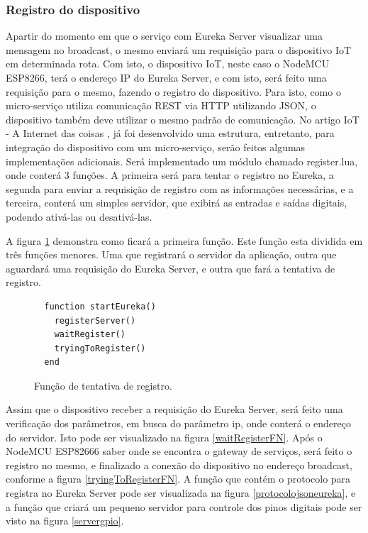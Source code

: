 \documentclass[journal]{IEEEtran}
\begin{document}
\subsubsection{Registro do dispositivo}

Apartir do momento em que o serviço com Eureka Server visualizar uma mensagem no broadcast, o mesmo enviará um requisição para o dispositivo IoT em determinada rota. Com isto, o dispositivo IoT, neste caso o NodeMCU ESP8266, terá o endereço IP do Eureka Server, e com isto, será feito uma requisição para o mesmo, fazendo o registro do dispositivo. Para isto, como o micro-serviço utiliza comunicação REST via HTTP utilizando JSON, o dispositivo também deve utilizar o mesmo padrão de comunicação. No artigo IoT - A Internet das coisas \cite{freiregebaraiot}, já foi desenvolvido uma estrutura, entretanto, para integração do dispositivo com um micro-serviço, serão feitos algumas implementações adicionais. Será implementado um módulo chamado register.lua, onde conterá 3 funções. A primeira será para tentar o registro no Eureka, a segunda para enviar a requisição de registro com as informações necessárias, e a terceira, conterá um simples servidor, que exibirá as entradas e saídas digitais, podendo ativá-las ou desativá-las. 


A figura \ref{functtentregistroeureka} demonstra como ficará a primeira função. Este função esta dividida em três funções menores. Uma que registrará o servidor da aplicação, outra que aguardará uma requisição do Eureka Server, e  outra que fará a tentativa de registro.

\begin{figure}[H]
\centering

\begin{lstlisting}
  function startEureka()
    registerServer()
    waitRegister()
    tryingToRegister()
  end
\end{lstlisting}
\caption{Função de tentativa de registro.}
\label{functtentregistroeureka}
\end{figure}
  
Assim que o dispositivo receber a requisição do Eureka Server, será feito uma verificação dos parâmetros, em busca do parâmetro ip, onde conterá o endereço do servidor. Isto pode ser visualizado na figura \ref{waitRegisterFN}. Após o NodeMCU ESP82666 saber onde se encontra o gateway de serviços, será feito o registro no mesmo, e finalizado a conexão do dispositivo no endereço broadcast, conforme a figura \ref{tryingToRegisterFN}. A função que contém o protocolo para registra no Eureka Server pode ser visualizada na figura \ref{protocolojsoneureka}, e a função que criará um pequeno servidor para controle dos pinos digitais pode ser visto na figura \ref{servergpio}.
\end{document}
